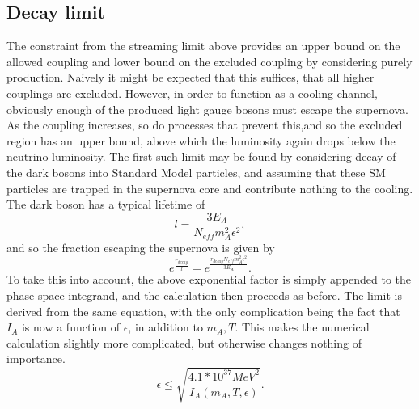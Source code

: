 \documentclass[nofootinbib,aps,prd,preprint,superscriptaddress]{revtex4}
\newcommand{\beq}{\begin{equation}}
\newcommand{\eeq}{\end{equation}}
\begin{document}
\subsection{Decay limit}
The constraint from the streaming limit above provides an upper bound on the allowed coupling and lower bound on the excluded coupling by considering purely production. Naively it might be expected that this suffices, that all higher couplings are excluded. However, in order to function as a cooling channel, obviously enough of the produced light gauge bosons must escape the supernova. As the coupling increases, so do processes that prevent this,and so the excluded region has an upper bound, above which the luminosity again drops below the neutrino luminosity. The first such limit may be found by considering decay of the dark bosons into Standard Model particles, and assuming that these SM particles are trapped in the supernova core and contribute nothing to the cooling. The dark boson has a typical lifetime of 
\beq
l = \frac{3 E_{A}}{N_{eff} m_A^2 \epsilon^2},
\eeq
and so the fraction escaping the supernova is given by 
\beq
e^{\frac{r_{decay}}{l}} = e^{\frac{r_{decay} N_{eff} m_A^2 \epsilon^2}{3 E_A}}.
\eeq
To take this into account, the above exponential factor is simply appended to the phase space integrand, and the calculation then proceeds as before. The limit is derived from the same equation, with the only complication being the fact that $ I_A $ is now a function of $ \epsilon $, in addition to $ m_A, T $. This makes the numerical calculation slightly more complicated, but otherwise changes nothing of importance. 
\beq
\epsilon \le \sqrt{\frac{4.1 * 10^{37} MeV^2}{I_A(m_A, T, \epsilon)}}.
\eeq
	
	
\end{document}
